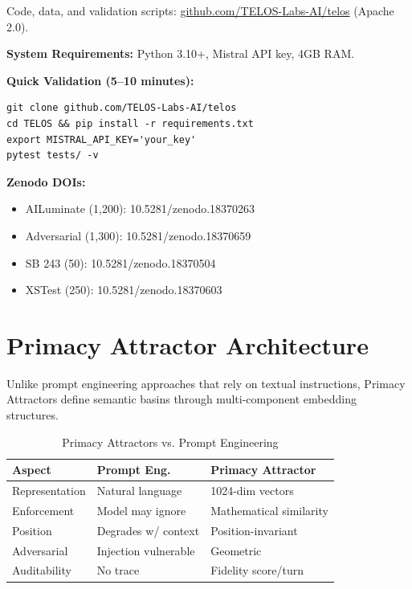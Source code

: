 \documentclass[11pt,twocolumn]{article}
\begin{document}
Code, data, and validation scripts: \url{github.com/TELOS-Labs-AI/telos} (Apache 2.0).

\textbf{System Requirements:} Python 3.10+, Mistral API key, 4GB RAM.

\textbf{Quick Validation (5--10 minutes):}
\begin{lstlisting}
git clone github.com/TELOS-Labs-AI/telos
cd TELOS && pip install -r requirements.txt
export MISTRAL_API_KEY='your_key'
pytest tests/ -v
\end{lstlisting}

\textbf{Zenodo DOIs:}
\begin{itemize}
    \item AILuminate (1,200): 10.5281/zenodo.18370263
    \item Adversarial (1,300): 10.5281/zenodo.18370659
    \item SB 243 (50): 10.5281/zenodo.18370504
    \item XSTest (250): 10.5281/zenodo.18370603
\end{itemize}

\appendix
\section{Primacy Attractor Architecture}

Unlike prompt engineering approaches that rely on textual instructions, Primacy Attractors define semantic basins through multi-component embedding structures.

\begin{table}[h]
\centering
\small
\caption{Primacy Attractors vs. Prompt Engineering}
\begin{tabular}{@{}lp{2cm}p{2.5cm}@{}}
\toprule
\textbf{Aspect} & \textbf{Prompt Eng.} & \textbf{Primacy Attractor} \\
\midrule
Representation & Natural language & 1024-dim vectors \\
Enforcement & Model may ignore & Mathematical similarity \\
Position & Degrades w/ context & Position-invariant \\
Adversarial & Injection vulnerable & Geometric \\
Auditability & No trace & Fidelity score/turn \\
\bottomrule
\end{tabular}
\end{table}
\end{document}
